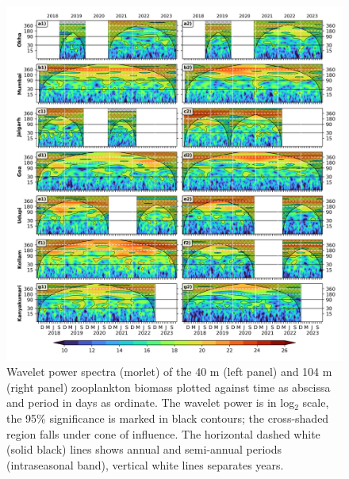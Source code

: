\documentclass[authoryear,review,12pt]{elsarticle}
\begin{document}
\begin{figure}[htbp]
	\centering
	\includegraphics[width=\textwidth]{./figures/west_coast_wavelet_40m_104m.png} 
	\captionsetup{justification=justified,font=footnotesize,skip=0.05\baselineskip,width=\textwidth}
	\caption{Wavelet power spectra (morlet) of the 40 m (left panel) and 104 m (right panel) zooplankton biomass plotted against time as abscissa and period in days as ordinate. The wavelet power is in log$_2$ scale, the 95\% significance is marked in black contours; the cross-shaded region falls under cone of influence. The horizontal dashed white (solid black) lines shows annual and semi-annual periods (intraseasonal band), vertical white lines separates years.}
	\label{fig:wave40104}
\end{figure}
\end{document}
